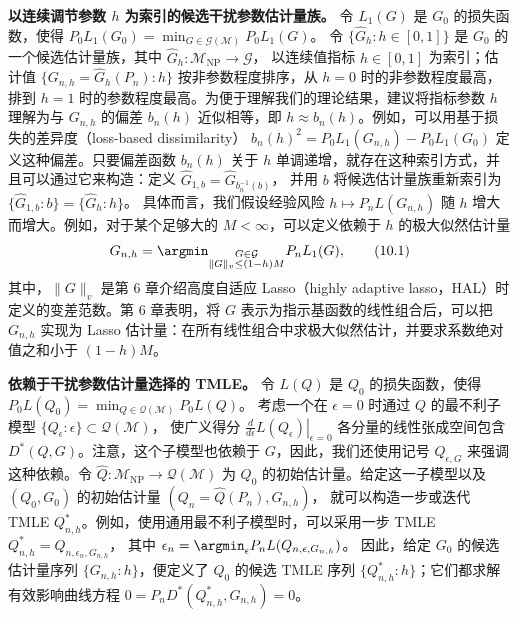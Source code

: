 \noindent\textbf{以连续调节参数 $h$ 为索引的候选干扰参数估计量族。}
令 $L_1(G)$ 是 $G_0$ 的损失函数，使得
$P_0L_1(G_0)=\min_{G\in\mathcal G(\mathcal M)}P_0L_1(G)$。
令 $\{\widehat G_h:h\in[0,1]\}$ 是 $G_0$ 的一个候选估计量族，其中
$\widehat G_h:\mathcal M_{\mathrm{NP}}\to\mathcal G$，
以连续值指标 $h\in[0,1]$ 为索引；估计值
$\{G_{n,h}=\widehat G_h(P_n):h\}$
按非参数程度排序，从 $h=0$ 时的非参数程度最高，排到 $h=1$ 时的参数程度最高。为便于理解我们的理论结果，建议将指标参数 $h$ 理解为与 $G_{n,h}$ 的偏差 $b_n(h)$ 近似相等，即 $h\approx b_n(h)$。例如，可以用基于损失的差异度（loss-based dissimilarity）
$b_n(h)^2=P_0L_1(G_{n,h})-P_0L_1(G_0)$
定义这种偏差。只要偏差函数 $b_n(h)$ 关于 $h$ 单调递增，就存在这种索引方式，并且可以通过它来构造：定义
$\widehat G_{1,b}=\widehat G_{b_n^{-1}(b)}$，
并用 $b$ 将候选估计量族重新索引为
$\{\widehat G_{1,b}:b\}=\{\widehat G_h:h\}$。
具体而言，我们假设经验风险 $h\mapsto P_nL(G_{n,h})$ 随 $h$ 增大而增大。例如，对于某个足够大的 $M<\infty$，可以定义依赖于 $h$ 的极大似然估计量
\begin{equation}
 G_{n,h}
 =\argmin_{\substack{G\in\mathcal G\\\|G\|_v\leq(1-h)M}}P_nL_1(G),
 \tag{10.1}
\end{equation}
其中，$\|G\|_v$ 是第 6 章介绍高度自适应 Lasso（highly adaptive lasso，HAL）时定义的变差范数。第 6 章表明，将 $G$ 表示为指示基函数的线性组合后，可以把 $G_{n,h}$ 实现为 Lasso 估计量：在所有线性组合中求极大似然估计，并要求系数绝对值之和小于 $(1-h)M$。

\noindent\textbf{依赖于干扰参数估计量选择的 TMLE。}
令 $L(Q)$ 是 $Q_0$ 的损失函数，使得
$P_0L(Q_0)=\min_{Q\in\mathcal Q(\mathcal M)}P_0L(Q)$。
考虑一个在 $\epsilon=0$ 时通过 $Q$ 的最不利子模型
$\{Q_\epsilon:\epsilon\}\subset\mathcal Q(\mathcal M)$，
使广义得分
$\left.\frac{d}{d\epsilon}L(Q_\epsilon)\right|_{\epsilon=0}$
各分量的线性张成空间包含 $D^*(Q,G)$。注意，这个子模型也依赖于 $G$，因此，我们还使用记号 $Q_{\epsilon,G}$ 来强调这种依赖。令
$\widehat Q:\mathcal M_{\mathrm{NP}}\to\mathcal Q(\mathcal M)$
为 $Q_0$ 的初始估计量。给定这一子模型以及 $(Q_0,G_0)$ 的初始估计量
$(Q_n=\widehat Q(P_n),G_{n,h})$，
就可以构造一步或迭代 TMLE $Q_{n,h}^*$。例如，使用通用最不利子模型时，可以采用一步 TMLE
$Q_{n,h}^*=Q_{n,\epsilon_n,G_{n,h}}$，
其中
$\epsilon_n=\argmin_\epsilon P_nL(Q_{n,\epsilon,G_{n,h}})$。
因此，给定 $G_0$ 的候选估计量序列 $\{G_{n,h}:h\}$，便定义了 $Q_0$ 的候选 TMLE 序列 $\{Q_{n,h}^*:h\}$；它们都求解有效影响曲线方程
$0=P_nD^*(Q_{n,h}^*,G_{n,h})=0$。

